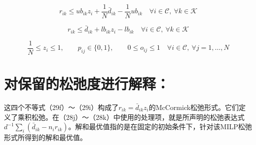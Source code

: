\documentclass{article}
\begin{document}
\begin{equation}
r_{ik} \le ub_{ik} z_i + \frac{1}{N}\bar d_{ik} - \frac{1}{N}ub_{ik}
\quad \forall i \in \mathcal C,\ \forall k \in \mathcal K
\tag{29h}
\end{equation}

\begin{equation}
r_{ik} \le \bar d_{ik} + lb_{ik} z_i - lb_{ik}
\quad \forall i \in \mathcal C,\ \forall k \in \mathcal K
\tag{29i}
\end{equation}

\begin{equation}
\frac{1}{N} \le z_i \le 1,\qquad
p_{ij}\in\{0,1\},\qquad
0 \le o_{ij} \le 1
\quad \forall i \in \mathcal C,\ \forall j=1,\dots,N
\tag{29j}
\end{equation}

\section*{对保留的松弛度进行解释：}
这四个不等式（29f）～（29i）构成了$r_{ik}=\bar d_{ik}z_i$的McCormick松弛形式。它们定义了乘积松弛。在（28j）～（28k）中使用的处理项，就是所声明的松弛表达式$d^{-1}\sum_i(\bar d_{ik}-n_i r_{ik})$。解和最优值指的是在固定的初始条件下，针对该MILP松弛形式所得到的解和最优值。
\end{document}

